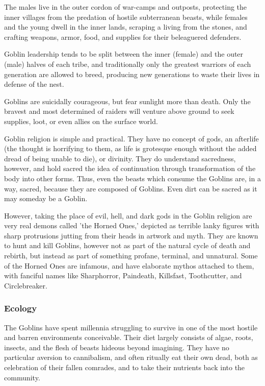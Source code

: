 \documentclass[oneside,11pt,english]{book}
\begin{document}
 
The males live in the outer cordon of war-camps and outposts, protecting the inner villages from the 
predation of hostile subterranean beasts, while females and the young dwell in the inner lands, scraping a 
living from the stones, and crafting weapons, armor, food, and supplies for their beleaguered defenders. 
 

Goblin leadership tends to be split between the inner (female) and the outer (male) halves of each tribe, 
and traditionally only the greatest warriors of each generation are allowed to breed, producing new 
generations to waste their lives in defense of the nest. 
 

Goblins are suicidally courageous, but fear sunlight more than death. Only the bravest and most 
determined of raiders will venture above ground to seek supplies, loot, or even allies on the surface world. 
 

Goblin religion is simple and practical. They have no concept of gods, an afterlife (the thought is 
horrifying to them, as life is grotesque enough without the added dread of being unable to die), or 
divinity. They do understand sacredness, however, and hold sacred the idea of continuation through 
transformation of the body into other forms. Thus, even the beasts which consume the Goblins are, in a 
way, sacred, because they are composed of Goblins. Even dirt can be sacred as it may someday be a 
Goblin. 

 
However, taking the place of evil, hell, and dark gods in the Goblin religion are very real demons called 
'the Horned Ones,' depicted as terrible lanky figures with sharp protrusions jutting from their heads in 
artwork and myth. They are known to hunt and kill Goblins, however not as part of the natural cycle of 
death and rebirth, but instead as part of something profane, terminal, and unnatural. Some of the Horned 
Ones are infamous, and have elaborate mythos attached to them, with fanciful names like Sharphorror, 
Paindeath, Killsfast, Toothcutter, and Circlebreaker. 
\subsubsection*{Ecology} 
The Goblins have spent millennia struggling to survive in one of the most hostile and barren 
environments conceivable. Their diet largely consists of algae, roots, insects, and the flesh of beasts 
hideous beyond imagining. They have no particular aversion to cannibalism, and often ritually eat their 
own dead, both as celebration of their fallen comrades, and to take their nutrients back into the 
community. 
\end{document}
